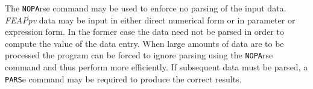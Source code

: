 \headb

The {\tt NOPA}rse command may be used to enforce no
parsing of the input data.  {\sl FEAPpv} data may be input in either
direct numerical form or in parameter or expression form.
In the former case the data need not be parsed in order to
compute the value of the data entry.  When large amounts of
data are to be processed the program can be forced to ignore
parsing using the {\tt NOPA}rse command and thus perform more efficiently.
If subsequent data must be parsed, a {\tt PARS}e command
may be required to produce the correct results.
\vfil\eject
